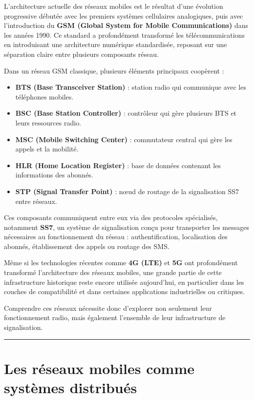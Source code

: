 \documentclass[
  french,
]{article}
\providecommand{\tightlist}{%
  \setlength{\itemsep}{0pt}\setlength{\parskip}{0pt}}
\begin{document}
L'architecture actuelle des réseaux mobiles est le résultat d'une
évolution progressive débutée avec les premiers systèmes cellulaires
analogiques, puis avec l'introduction du \textbf{GSM (Global System for
Mobile Communications)} dans les années 1990. Ce standard a profondément
transformé les télécommunications en introduisant une architecture
numérique standardisée, reposant sur une séparation claire entre
plusieurs composants réseau.

Dans un réseau GSM classique, plusieurs éléments principaux coopèrent :

\begin{itemize}
\tightlist
\item
  \textbf{BTS (Base Transceiver Station)} : station radio qui communique
  avec les téléphones mobiles.
\item
  \textbf{BSC (Base Station Controller)} : contrôleur qui gère plusieurs
  BTS et leurs ressources radio.
\item
  \textbf{MSC (Mobile Switching Center)} : commutateur central qui gère
  les appels et la mobilité.
\item
  \textbf{HLR (Home Location Register)} : base de données contenant les
  informations des abonnés.
\item
  \textbf{STP (Signal Transfer Point)} : nœud de routage de la
  signalisation SS7 entre réseaux.
\end{itemize}

Ces composants communiquent entre eux via des protocoles spécialisés,
notamment \textbf{SS7}, un système de signalisation conçu pour
transporter les messages nécessaires au fonctionnement du réseau :
authentification, localisation des abonnés, établissement des appels ou
routage des SMS.

Même si les technologies récentes comme \textbf{4G (LTE)} et \textbf{5G}
ont profondément transformé l'architecture des réseaux mobiles, une
grande partie de cette infrastructure historique reste encore utilisée
aujourd'hui, en particulier dans les couches de compatibilité et dans
certaines applications industrielles ou critiques.

Comprendre ces réseaux nécessite donc d'explorer non seulement leur
fonctionnement radio, mais également l'ensemble de leur infrastructure
de signalisation.

\begin{center}\rule{0.5\linewidth}{0.5pt}\end{center}

\section{Les réseaux mobiles comme systèmes
distribués}\label{les-ruxe9seaux-mobiles-comme-systuxe8mes-distribuuxe9s}
\end{document}
